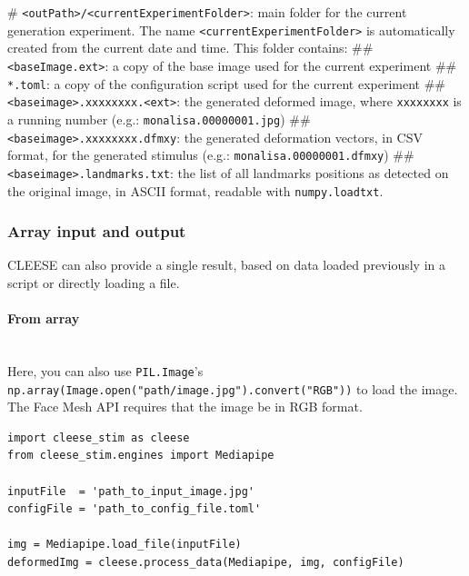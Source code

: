 \documentclass[oneside,10pt]{article}
\newcommand{\mip}{\texttt}
\begin{document}
\begin{sloppypar}
\vspace{5pt}
\begin{easylist}[itemize]
# \texttt{<outPath>/<currentExperimentFolder>}: main folder for the current
        generation experiment. The name \texttt{<currentExperimentFolder>} is
        automatically created from the current date and time. This folder
        contains:
## \texttt{<baseImage.ext>}: a copy of the base image used for the current experiment
## \texttt{*.toml}: a copy of the configuration script used for the current experiment
## \texttt{<baseimage>.xxxxxxxx.<ext>}: the generated deformed image, where
        \texttt{xxxxxxxx} is a running number (e.g.:
        \texttt{monalisa.00000001.jpg})
## \texttt{<baseimage>.xxxxxxxx.dfmxy}: the generated deformation vectors, in
        CSV format, for the generated stimulus (e.g.:
        \texttt{monalisa.00000001.dfmxy})
## \texttt{<baseimage>.landmarks.txt}: the list of all landmarks positions as
        detected on the original image, in ASCII format, readable with
        \texttt{numpy.loadtxt}.
\end{easylist}
\vspace{8pt}
\end{sloppypar}

\subsubsection{Array input and output}

CLEESE can also provide a single result, based on data loaded previously in a
script or directly loading a file.

\paragraph*{From array}~\\

Here, you can also use \texttt{PIL.Image}'s
\mip{np.array(Image.open("path/image.jpg").convert("RGB"))} to load the image.
The Face Mesh API requires that the image be in RGB format.

\vspace{8pt}
\begin{verbatim}
import cleese_stim as cleese
from cleese_stim.engines import Mediapipe

inputFile  = 'path_to_input_image.jpg'
configFile = 'path_to_config_file.toml'

img = Mediapipe.load_file(inputFile)
deformedImg = cleese.process_data(Mediapipe, img, configFile)
\end{verbatim}
\vspace{8pt}
\end{document}
